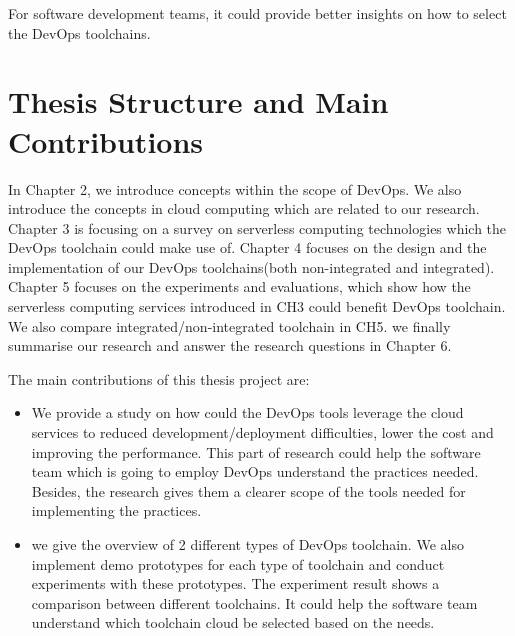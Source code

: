 For software development teams, it could provide better insights on how to select the DevOps toolchains.
\section{Thesis Structure and Main Contributions}
In Chapter 2, we introduce concepts within the scope of DevOps. We also introduce the concepts in cloud computing which are related to our research. Chapter 3 is focusing on a survey on serverless computing technologies which the DevOps toolchain could make use of. Chapter 4 focuses on the design and the implementation of our DevOps toolchains(both non-integrated and integrated). Chapter 5 focuses on the experiments and evaluations, which show how the serverless computing services introduced in CH3 could benefit DevOps toolchain. We also compare integrated/non-integrated toolchain in CH5. we finally summarise our research and answer the research questions in Chapter 6.
\par
The main contributions of this thesis project are:
\begin{itemize}
    \item We provide a study on how could the DevOps tools leverage the cloud services to reduced development/deployment difficulties, lower the cost and improving the performance. This part of research could help the software team which is going to employ DevOps understand the practices needed. Besides, the research gives them a clearer scope of the tools needed for implementing the practices.
    \item we give the overview of 2 different types of DevOps toolchain. We also implement demo prototypes for each type of toolchain and conduct experiments with these prototypes. The experiment result shows a comparison between different toolchains. It could help the software team understand which toolchain cloud be selected based on the needs.
\end{itemize}